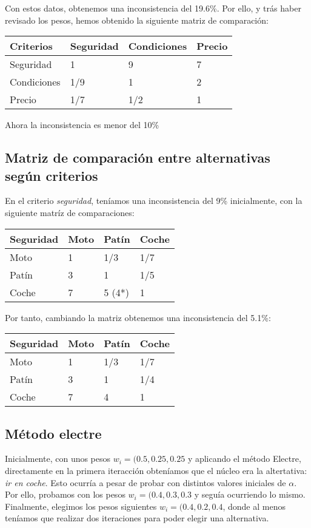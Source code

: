 \documentclass[
]{article}
\begin{document}
Con estos datos, obtenemos una inconsistencia del 19.6\%. Por ello, y
trás haber revisado los pesos, hemos obtenido la siguiente matriz de
comparación:

\begin{longtable}[]{@{}llll@{}}
\toprule
Criterios & Seguridad & Condiciones & Precio \\
\midrule
\endhead
Seguridad & 1 & 9 & 7 \\
Condiciones & 1/9 & 1 & 2 \\
Precio & 1/7 & 1/2 & 1 \\
\bottomrule
\end{longtable}

Ahora la inconsistencia es menor del 10\%

\hypertarget{matriz-de-comparaciuxf3n-entre-alternativas-seguxfan-criterios}{%
\subsection{Matriz de comparación entre alternativas según
criterios}\label{matriz-de-comparaciuxf3n-entre-alternativas-seguxfan-criterios}}

En el criterio \emph{seguridad}, teníamos una inconsistencia del 9\%
inicialmente, con la siguiente matríz de comparaciones:

\begin{longtable}[]{@{}llll@{}}
\toprule
Seguridad & Moto & Patín & Coche \\
\midrule
\endhead
Moto & 1 & 1/3 & 1/7 \\
Patín & 3 & 1 & 1/5 \\
Coche & 7 & 5 (4*) & 1 \\
\bottomrule
\end{longtable}

Por tanto, cambiando la matriz obtenemos una inconsistencia del 5.1\%:

\begin{longtable}[]{@{}llll@{}}
\toprule
Seguridad & Moto & Patín & Coche \\
\midrule
\endhead
Moto & 1 & 1/3 & 1/7 \\
Patín & 3 & 1 & 1/4 \\
Coche & 7 & 4 & 1 \\
\bottomrule
\end{longtable}

\hypertarget{muxe9todo-electre-1}{%
\subsection{Método electre}\label{muxe9todo-electre-1}}

Inicialmente, con unos pesos \(w_i=(0.5,0.25,0.25\) y aplicando el
método Electre, directamente en la primera iteracción obteníamos que el
núcleo era la altertativa: \emph{ir en coche}. Esto ocurría a pesar de
probar con distintos valores iniciales de \(\alpha\). Por ello, probamos
con los pesos \(w_i=(0.4,0.3,0.3\) y seguía ocurriendo lo mismo.
Finalmente, elegimos los pesos siguientes \(w_i=(0.4,0.2,0.4\), donde al
menos teníamos que realizar dos iteraciones para poder elegir una
alternativa.
\end{document}
